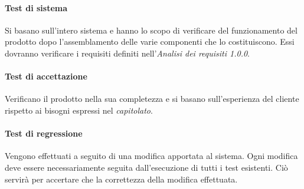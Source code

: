 \paragraph{Test di sistema} 
Si basano sull'intero sistema e hanno lo scopo di verificare del funzionamento del prodotto dopo l'assemblamento delle varie componenti che lo costituiscono. Essi dovranno verificare i requisiti definiti nell'\textit{Analisi dei requisiti 1.0.0\docs}.

\paragraph{Test di accettazione}
Verificano il prodotto nella sua completezza e si basano sull'esperienza del cliente rispetto ai bisogni espressi nel \textit{capitolato\glos}.

\paragraph{Test di regressione}
Vengono effettuati a seguito di una modifica apportata al sistema. Ogni modifica deve essere necessariamente seguita dall'esecuzione di tutti i test esistenti. Ciò servirà per accertare che la correttezza della modifica effettuata. 